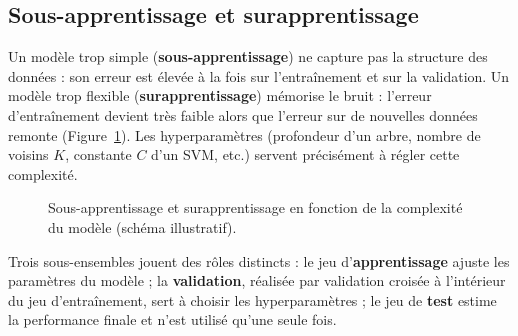 \documentclass[11pt,a4paper]{report}
\numberwithin{equation}{chapter}
\begin{document}
\subsection{Sous-apprentissage et surapprentissage}
Un modèle trop simple (\textbf{sous-apprentissage}) ne capture pas la structure des données : son erreur est élevée à la fois sur l'entraînement et sur la validation. Un modèle trop flexible (\textbf{surapprentissage}) mémorise le bruit : l'erreur d'entraînement devient très faible alors que l'erreur sur de nouvelles données remonte (Figure~\ref{fig:surapp}). Les hyperparamètres (profondeur d'un arbre, nombre de voisins $K$, constante $C$ d'un SVM, etc.) servent précisément à régler cette complexité.

\begin{figure}[!htbp]
\centering
{}
\caption{Sous-apprentissage et surapprentissage en fonction de la complexité du modèle (schéma illustratif).}\label{fig:surapp}
\end{figure}

Trois sous-ensembles jouent des rôles distincts : le jeu d'\textbf{apprentissage} ajuste les paramètres du modèle ; la \textbf{validation}, réalisée par validation croisée à l'intérieur du jeu d'entraînement, sert à choisir les hyperparamètres ; le jeu de \textbf{test} estime la performance finale et n'est utilisé qu'une seule fois.
\end{document}
